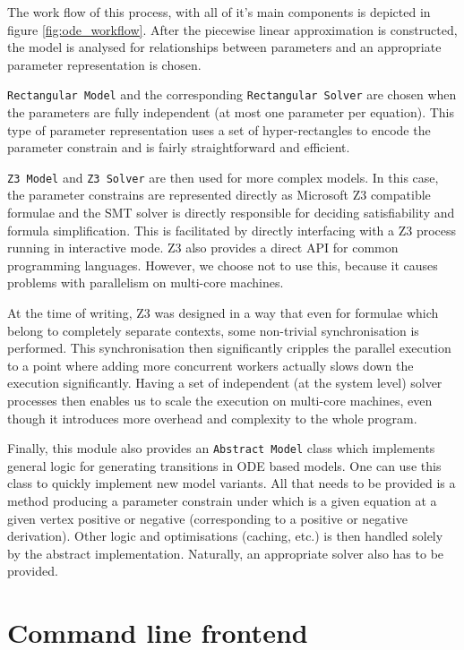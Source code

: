 The work flow of this process, with all of it's main components is depicted in figure \ref{fig:ode_workflow}. After the piecewise linear approximation is constructed, the model is analysed for relationships between parameters and an appropriate parameter representation is chosen.

\texttt{Rectangular Model} and the corresponding \texttt{Rectangular Solver} are chosen when the parameters are fully independent (at most one parameter per equation). This type of parameter representation uses a set of hyper-rectangles to encode the parameter constrain and is fairly straightforward and efficient.

\texttt{Z3 Model} and \texttt{Z3 Solver} are then used for more complex models. In this case, the parameter constrains are represented directly as Microsoft Z3 compatible formulae and the SMT solver is directly responsible for deciding satisfiability and formula simplification. This is facilitated by directly interfacing with a Z3 process running in interactive mode. Z3 also provides a direct API for common programming languages. However, we choose not to use this, because it causes problems with parallelism on multi-core machines. 

At the time of writing, Z3 was designed in a way that even for formulae which belong to completely separate contexts, some non-trivial synchronisation is performed. This synchronisation then significantly cripples the parallel execution to a point where adding more concurrent workers actually slows down the execution significantly. Having a set of independent (at the system level) solver processes then enables us to scale the execution on multi-core machines, even though it introduces more overhead and complexity to the whole program.

Finally, this module also provides an \texttt{Abstract Model} class which implements general logic for generating transitions in ODE based models. One can use this class to quickly implement new model variants. All that needs to be provided is a method producing a parameter constrain under which is a given equation at a given vertex positive or negative (corresponding to a positive or negative derivation). Other logic and optimisations (caching, etc.) is then handled solely by the abstract implementation. Naturally, an appropriate solver also has to be provided.

\section{Command line frontend}

